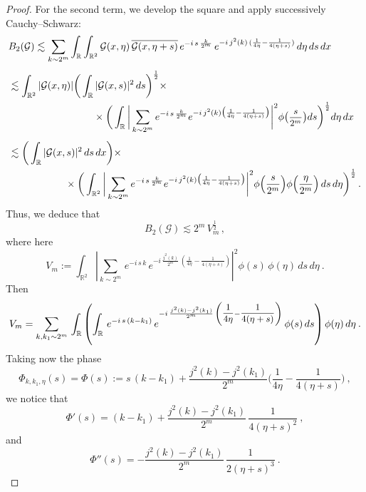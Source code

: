 \documentclass[a4paper,reqno]{amsart}
\numberwithin{equation}{section}
\theoremstyle{definition}
\newcommand{\R}{\mathbb{R}}
\newcommand{\sdfrac}[2]{\mbox{\small$\displaystyle\frac{#1}{#2}$}}
\def\G{\mathcal{G}}
\begin{document}
\begin{proof}
For the second term, we develop the square and apply successively Cauchy--Schwarz:
\begin{align}
	& B_2(\G)\lesssim \sum_{k\sim 2^m}\int_{\R}\int_{\R^2}\G(x,\eta)\,\overline{\G(x,\eta+s)}\,e^{-i\,s\,\frac{k}{2^m}}\,e^{-i\,j^2(k)\,(\frac{1}{4 \eta}-\frac{1}{4 (\eta+s)})}\,d\eta\,ds\,dx\nonumber \\[1ex]
	&\lesssim\int_{\R^2} |\G(x,\eta)| \bigg(\int_{\R}|\G(x,s)|^2\,ds\bigg)^{\frac{1}{2}}\times\nonumber\\
	&\hspace{3cm}\times \bigg(\int_{\R}\bigg|\sum_{k\sim 2^m}e^{-i\,s\,\frac{k}{2^m}}e^{-i\,j^2(k)\big(\frac{1}{4 \eta}-\frac{1}{4(\eta+s)}\big)}\bigg|^2 \phi\big(\sdfrac{s}{2^m}\big)ds\bigg)^{\frac{1}{2}}d\eta\,dx\nonumber\\[1ex]
	&\lesssim\bigg(\int_{\R}|\G(x,s)|^2\,ds\,dx\bigg)\times\nonumber\\
	&\hspace{2cm}\times
	\bigg(\int_{\R^2}\bigg|\sum_{k\sim 2^m} e^{-i\,s\,\frac{k}{2^m}} e^{-i\,j^2(k) \big(\frac{1}{4 \eta}-\frac{1}{4 (\eta+s)}\big)}\bigg|^2\phi\Big(\frac{s}{2^m}\Big)\phi\Big(\frac{\eta}{2^m}\Big)\,ds\,d\eta\bigg)^{\frac{1}{2}}\,.\nonumber
\end{align}
Thus, we deduce that
\begin{equation}\label{reduct22}
B_2(\G)\lesssim 2^{m}\,V_m^{\frac{1}{2}}\,,
\end{equation}
where here
\begin{equation}\label{V}
	V_m:=\int_{\R^2}\left|\sum_{k\sim 2^m}\,e^{-i\,s\,k}\,e^{-i\,\frac{j^2(k)}{2^m}\,\left(\frac{1}{4 \eta}-\frac{1}{4 (\eta+s)}\right)}\right|^2\phi(s)\,\phi(\eta)\,ds\,d\eta\:.
\end{equation}
Then
$$V_m=\sum_{k,k_1\sim 2^m}\,\int_{\R}\left(\int_{\R}\,e^{-i\,s\,(k-k_1)}\,e^{-i\,\frac{j^2(k)-j^2(k_1)}{2^m}\,\left(\sdfrac{1}{4 \eta}-\sdfrac{1}{4 (\eta+s)}\right)}\,\phi(s)\,ds\right)\phi(\eta)\,d\eta\:.$$
Taking now the phase
\begin{equation}\label{Ph}
	\Phi_{k,k_1,\eta}(s)=\Phi(s):=s\,(k-k_1)+ \frac{j^2(k)-j^2(k_1)}{2^m}\Big(\frac{1}{4 \eta}-\frac{1}{4 (\eta+s)}\Big)\:,
\end{equation}
we notice that
\begin{equation}\label{Ph1}
	\Phi'(s)=(k-k_1)+ \frac{j^2(k)-j^2(k_1)}{2^m}\,\frac{1}{4 (\eta+s)^2}\:,
\end{equation}
and
\begin{equation}\label{Ph2}
	\Phi''(s)=-\frac{j^2(k)-j^2(k_1)}{2^m}\,\frac{1}{2 (\eta+s)^3}\:.

\end{equation}
\end{proof}
\end{document}

